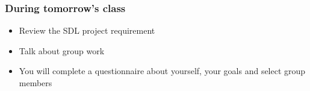 \begin{frame}\frametitle{During tomorrow's class}
	\begin{itemize}
		\item	Review the SDL project requirement
		\item	Talk about group work
		\item	You will complete a questionnaire about yourself, your goals and select group members
	\end{itemize}
\end{frame}

\begin{comment}
\begin{frame}\frametitle{SDL Project}
	A major component of the course is the self-directed learning (SDL) project.
\end{frame}

\begin{frame}\frametitle{Self-directed learning (SDL)}
	Any examples of self-directed learning you've succeeded at recently?
	\begin{itemize}
		\item	learn how to ride a motorcycle
		\item	\iftoggle{instructor}{how to fix drywall}{}
		\item	\iftoggle{instructor}{change your car's oil}{}		
		\item	\iftoggle{instructor}{fix plumbing in your apartment}{}
		\item	\iftoggle{instructor}{cook an ethnic food dish to impress your date/partner}{}
		\item	\iftoggle{instructor}{something learned during your co-op work term?}{}
		\item	\iftoggle{instructor}{going through process of buying a car or a house}{}
		\item	\iftoggle{instructor}{plant, grow and maintain your own vegetables}{}
		\item	\iftoggle{instructor}{learn a new language for travel/pleasure}{}
		\item	\iftoggle{instructor}{start your own company and run it: what is required?}{}
		\item	\iftoggle{instructor}{figure out if I'm better off buying a new car or a used car?}{}
	\end{itemize}
	\vspace{12pt}
	Our 1st tutorial, next Monday, on personal finance: {\small \color{myOrange}{completely SDL}}
\end{frame}


\end{comment}
